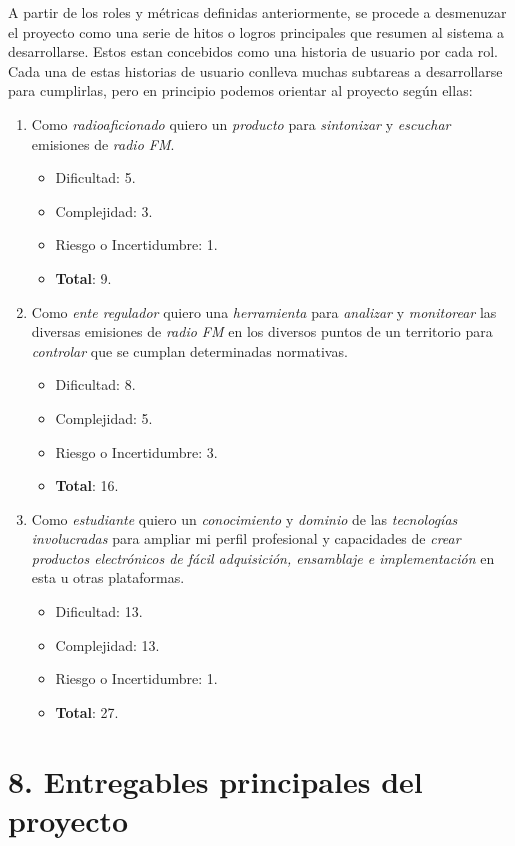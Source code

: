 \documentclass[
11pt, %
codirector, %
]{charter}
\begin{document}
A partir de los roles y métricas definidas anteriormente, se procede a desmenuzar el proyecto como una serie de hitos o logros principales que resumen al sistema a desarrollarse. Estos estan concebidos como una historia de usuario por cada rol. Cada una de estas historias de usuario conlleva muchas subtareas a desarrollarse para cumplirlas, pero en principio podemos orientar al proyecto según ellas:

\begin{enumerate}
	\item Como \textit{radioaficionado} quiero un \textit{producto} para \textit{sintonizar} y \textit{escuchar} emisiones de \textit{radio FM}.
		\begin{itemize}
			\item Dificultad: 5.
			\item Complejidad: 3.
			\item Riesgo o Incertidumbre: 1.
			\item \textbf{Total}: 9.
		\end{itemize}
	\item Como \textit{ente regulador} quiero una \textit{herramienta} para \textit{analizar} y \textit{monitorear} las diversas emisiones de \textit{radio FM} en los diversos puntos de un territorio para \textit{controlar} que se cumplan determinadas normativas.
		\begin{itemize}
			\item Dificultad: 8.
			\item Complejidad: 5.
			\item Riesgo o Incertidumbre: 3.
			\item \textbf{Total}: 16.
		\end{itemize}
	\item Como \textit{estudiante} quiero un \textit{conocimiento} y \textit{dominio} de las \textit{tecnologías involucradas} para ampliar mi perfil profesional y capacidades de \textit{crear productos electrónicos de fácil adquisición, ensamblaje e implementación} en esta u otras plataformas.
		\begin{itemize}
			\item Dificultad: 13.
			\item Complejidad: 13.
			\item Riesgo o Incertidumbre: 1.
			\item \textbf{Total}: 27.
		\end{itemize}
\end{enumerate}


\section{8. Entregables principales del proyecto}
\label{sec:entregables}
\end{document}

